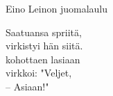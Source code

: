 \begin{song}{Eino Leinon juomalaulu}
	
	
	Saatuansa spriitä,\\
	virkistyi hän siitä.\\
	kohottaen lasiaan\\
	virkkoi: "Veljet,\\
	-- Asiaan!"

	
\end{song}

